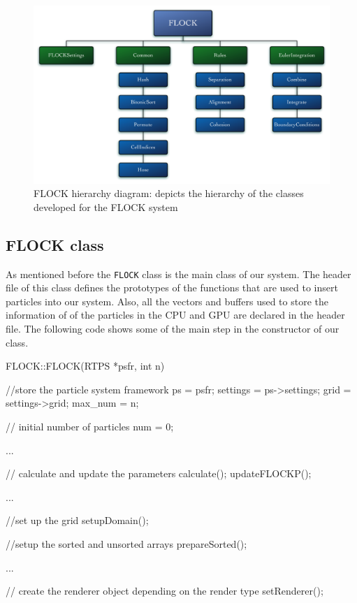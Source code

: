 \begin{figure}[htbp]
\begin{center}
\includegraphics[scale=0.3]{figures/FLOCKdiagramMyrna.pdf}
\caption{FLOCK hierarchy diagram: depicts the hierarchy of the classes developed for the FLOCK system}
\label{flockdiagram}
\end{center}
\end{figure}


\subsection{FLOCK class}
As mentioned before the \texttt{FLOCK} class is the main class of our system. The header file of this class defines the prototypes of the functions that are used to insert particles into our system. Also, all the vectors and buffers used to store the information of of the particles in the CPU and GPU are declared in the header file. The following code shows some of the main step in the constructor of our class.

\begin{cppcode}{0}
FLOCK::FLOCK(RTPS *psfr, int n)
 {
 	//store the particle system framework
 	ps = psfr;
	settings = ps->settings;
	grid = settings->grid;
	max_num = n;
	
	// initial number of particles
	num = 0;
 	
	...
 
 	// calculate and update the parameters
	calculate();
	updateFLOCKP();

	...

	//set up the grid
	setupDomain();
	
	//setup the sorted and unsorted arrays
	prepareSorted();
 	 
	 ...
		
	// create the renderer object depending on the render type		
	setRenderer(); 
}
\end{cppcode}

